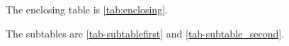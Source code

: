 \documentclass{article}
\begin{document}
\listoftables

\begin{table}
\caption{Enclosing Table}
\label{tab:enclosing}
\begin{center}
\qquad
{}
\end{center}
\end{table}

The enclosing table is \ref{tab:enclosing}.

The subtables are \ref{tab-subtablefirst} and \ref{tab-subtable_second}.
\end{document}
